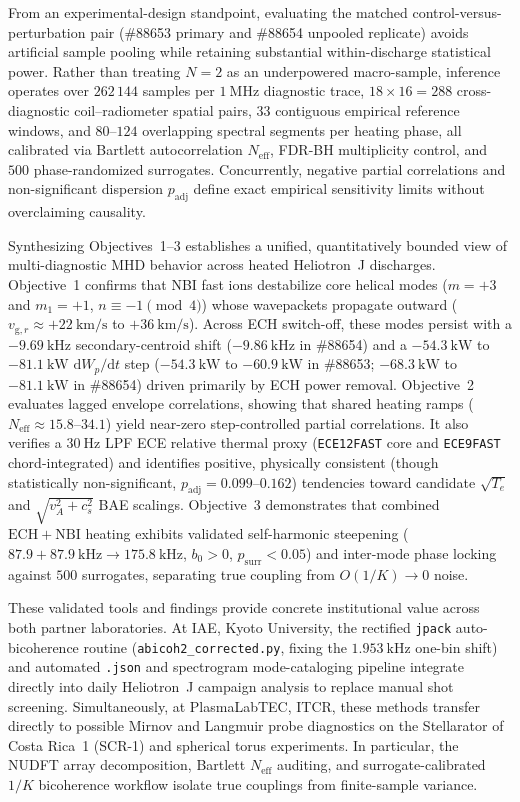 From an experimental-design standpoint, evaluating the matched control-versus-perturbation pair (\#88653 primary and \#88654 unpooled replicate) avoids artificial sample pooling while retaining substantial within-discharge statistical power. Rather than treating $N = 2$ as an underpowered macro-sample, inference operates over $262\,144$ samples per $1~\mathrm{MHz}$ diagnostic trace, $18 \times 16 = 288$ cross-diagnostic coil--radiometer spatial pairs, $33$ contiguous empirical reference windows, and $80\text{--}124$ overlapping spectral segments per heating phase, all calibrated via Bartlett autocorrelation $N_{\mathrm{eff}}$, FDR-BH multiplicity control, and $500$ phase-randomized surrogates. Concurrently, negative partial correlations and non-significant dispersion $p_{\mathrm{adj}}$ define exact empirical sensitivity limits without overclaiming causality.

Synthesizing Objectives~1--3 establishes a unified, quantitatively bounded view of multi-diagnostic MHD behavior across heated Heliotron~J discharges. Objective~1 confirms that NBI fast ions destabilize core helical modes ($m = +3$ and $m_1 = +1$, $n \equiv -1 \pmod 4$) whose wavepackets propagate outward ($v_{\mathrm{g},r} \approx +22~\mathrm{km/s}$ to $+36~\mathrm{km/s}$). Across ECH switch-off, these modes persist with a $-9.69~\mathrm{kHz}$ secondary-centroid shift ($-9.86~\mathrm{kHz}$ in \#88654) and a $-54.3~\mathrm{kW}$ to $-81.1~\mathrm{kW}$ $\mathrm{d}W_p/\mathrm{d}t$ step ($-54.3~\mathrm{kW}$ to $-60.9~\mathrm{kW}$ in \#88653; $-68.3~\mathrm{kW}$ to $-81.1~\mathrm{kW}$ in \#88654) driven primarily by ECH power removal. Objective~2 evaluates lagged envelope correlations, showing that shared heating ramps ($N_{\mathrm{eff}} \approx 15.8\text{--}34.1$) yield near-zero step-controlled partial correlations. It also verifies a $30~\mathrm{Hz}$ LPF ECE relative thermal proxy (\texttt{ECE12FAST} core and \texttt{ECE9FAST} chord-integrated) and identifies positive, physically consistent (though statistically non-significant, $p_{\mathrm{adj}} = 0.099\text{--}0.162$) tendencies toward candidate $\sqrt{T_e}$ and $\sqrt{v_A^2 + c_s^2}$ BAE scalings. Objective~3 demonstrates that combined $\mathrm{ECH}+\mathrm{NBI}$ heating exhibits validated self-harmonic steepening ($87.9 + 87.9~\mathrm{kHz} \to 175.8~\mathrm{kHz}$, $b_0 > 0$, $p_{\mathrm{surr}} < 0.05$) and inter-mode phase locking against $500$ surrogates, separating true coupling from $O(1/K) \to 0$ noise.

These validated tools and findings provide concrete institutional value across both partner laboratories. At IAE, Kyoto University, the rectified \texttt{jpack} auto-bicoherence routine (\texttt{abicoh2\_\allowbreak corrected.py}, fixing the $1.953~\mathrm{kHz}$ one-bin shift) and automated \texttt{.json} and spectrogram mode-cataloging pipeline integrate directly into daily Heliotron~J campaign analysis to replace manual shot screening. Simultaneously, at PlasmaLabTEC, ITCR, these methods transfer directly to possible Mirnov and Langmuir probe diagnostics on the Stellarator of Costa Rica~1 (SCR-1) and spherical torus experiments. In particular, the NUDFT array decomposition, Bartlett $N_{\mathrm{eff}}$ auditing, and surrogate-calibrated $1/K$ bicoherence workflow isolate true couplings from finite-sample variance.
